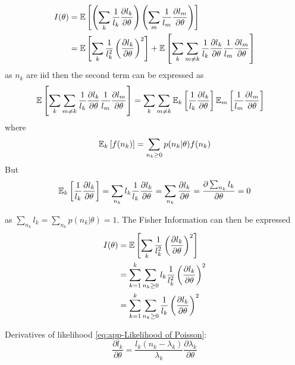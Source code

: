 \begin{alignat*}{1}
	I(\theta) 
	& =\mathbb{E}\left[\left(\sum_k\frac{1}{l_k}\frac{\partial l_k}{\partial\theta}\right)\left(\sum_{m}\frac{1}{l_{m}}\frac{\partial l_{m}}{\partial\theta}\right)\right]\\
	& =\mathbb{E}\left[\sum_k\frac{1}{l_k^2}\left(\frac{\partial l_k}{\partial\theta}\right)^2\right]+\mathbb{E}\left[\sum_k\sum_{m\neq k}\frac{1}{l_k}\frac{\partial l_k}{\partial\theta}\frac{1}{l_{m}}\frac{\partial l_{m}}{\partial\theta}\right]
\end{alignat*}
%
as $n_k$ are iid then the second term can be expressed as 
%
\begin{align*}
	\mathbb{E}\left[\sum_k\sum_{m\neq k}\frac{1}{l_k}\frac{\partial l_k}{\partial\theta}\frac{1}{l_{m}}\frac{\partial l_{m}}{\partial\theta}\right] 
	& =\sum_k\sum_{m\neq k}\mathbb{E}_k\left[\frac{1}{l_k}\frac{\partial l_k}{\partial\theta}\right]\mathbb{E}_{m}\left[\frac{1}{l_{m}}\frac{\partial l_{m}}{\partial\theta}\right]
\end{align*}
%
where
%
\begin{equation}
	\mathbb{E}_k\left[f(n_k)\right]=\sum_{n_k\geq0}p(n_k|\theta)f(n_k)
\end{equation}
%
But 
\begin{equation}
	\mathbb{E}_k\left[\frac{1}{l_k}\frac{\partial l_k}{\partial\theta}\right]=\sum_{n_k}l_k\frac{1}{l_k}\frac{\partial l_k}{\partial\theta}=\sum_{n_k}\frac{\partial l_k}{\partial\theta}=\frac{\partial\sum_{n_k}l_k}{\partial\theta}=0
\end{equation}

as $\sum_{n_k}l_k=\sum_{n_k}p(n_k|\theta)=1$. The Fisher Information can then be expressed 
%
\begin{align*}
	I(\theta) & =\mathbb{E}\left[\sum_k\frac{1}{l_k^2}\left(\frac{\partial l_k}{\partial\theta}\right)^2\right]\\
	& =\sum_{k=1}^k\sum_{n_k\geq0}l_k\frac{1}{l_k^2}\left(\frac{\partial l_k}{\partial\theta}\right)^2\\
	& =\sum_{k=1}^k\sum_{n_k\geq0}\frac{1}{l_k}\left(\frac{\partial l_k}{\partial\theta}\right)^2
\end{align*}

Derivatives of likelihood \autoref{eq:app-Likelihood of Poisson}: 
%
\begin{equation}
	\frac{\partial l_k}{\partial\theta}=\frac{l_k(n_k-\lambda_k)}{\lambda_k}\frac{\partial\lambda_k}{\partial\theta}
\end{equation}

